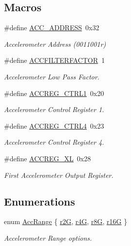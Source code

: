 \subsection*{Macros}
\begin{DoxyCompactItemize}
\item 
\#define \hyperlink{group__acc_ga27341a8e1cb1a6ace5a5cf3caea1c99f}{A\-C\-C\-\_\-\-A\-D\-D\-R\-E\-S\-S}~0x32
\begin{DoxyCompactList}\small\item\em Accelerometer Address (0011001r) \end{DoxyCompactList}\item 
\#define \hyperlink{group__acc_gaace41596724b03f3f2b2ee28b7e87272}{A\-C\-C\-F\-I\-L\-T\-E\-R\-F\-A\-C\-T\-O\-R}~1
\begin{DoxyCompactList}\small\item\em Accelerometer Low Pass Factor. \end{DoxyCompactList}\item 
\#define \hyperlink{group__acc_gae81a43863d896c9afe65cc45bf8db9dc}{A\-C\-C\-R\-E\-G\-\_\-\-C\-T\-R\-L1}~0x20
\begin{DoxyCompactList}\small\item\em Accelerometer Control Register 1. \end{DoxyCompactList}\item 
\#define \hyperlink{group__acc_ga4369b46f297623a18b9d937623b7f783}{A\-C\-C\-R\-E\-G\-\_\-\-C\-T\-R\-L4}~0x23
\begin{DoxyCompactList}\small\item\em Accelerometer Control Register 4. \end{DoxyCompactList}\item 
\#define \hyperlink{group__acc_ga9d03f89f2f3ef006967f84157a21075b}{A\-C\-C\-R\-E\-G\-\_\-\-X\-L}~0x28
\begin{DoxyCompactList}\small\item\em First Accelerometer Output Register. \end{DoxyCompactList}\end{DoxyCompactItemize}
\subsection*{Enumerations}
\begin{DoxyCompactItemize}
\item 
enum \hyperlink{group__acc_ga3d56e56c162b045de727006a11880324}{Acc\-Range} \{ \hyperlink{group__acc_gga3d56e56c162b045de727006a11880324a4a2974e8d1854463238577802e1253f4}{r2\-G}, 
\hyperlink{group__acc_gga3d56e56c162b045de727006a11880324a9b1fcfa48172993a069412d5eecd6689}{r4\-G}, 
\hyperlink{group__acc_gga3d56e56c162b045de727006a11880324ac131fa2bab37bb0c8e152a91ce2b6bcf}{r8\-G}, 
\hyperlink{group__acc_gga3d56e56c162b045de727006a11880324af3fee93850514c5235659c573611f183}{r16\-G}
 \}
\begin{DoxyCompactList}\small\item\em Accelerometer Range options. \end{DoxyCompactList}\end{DoxyCompactItemize}
